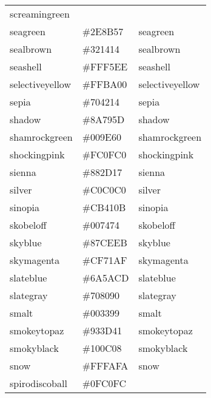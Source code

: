 \documentclass[
]{article}
\begin{document}
\begin{longtable}[]{@{}lll@{}}
\textcolor[rgb]{0.46,1.0,0.44}{screamingreen         }\tabularnewline
seagreen & \colorbox[rgb]{0.18,0.55,0.34}{\#2E8B57} &
\textcolor[rgb]{0.18,0.55,0.34}{seagreen              }\tabularnewline
sealbrown & \colorbox[rgb]{0.2,0.08,0.08}{\#321414} &
\textcolor[rgb]{0.2,0.08,0.08}{sealbrown             }\tabularnewline
seashell & \colorbox[rgb]{1.0,0.96,0.93}{\#FFF5EE} &
\textcolor[rgb]{1.0,0.96,0.93}{seashell              }\tabularnewline
selectiveyellow & \colorbox[rgb]{1.0,0.73,0.0}{\#FFBA00} &
\textcolor[rgb]{1.0,0.73,0.0}{selectiveyellow       }\tabularnewline
sepia & \colorbox[rgb]{0.44,0.26,0.08}{\#704214} &
\textcolor[rgb]{0.44,0.26,0.08}{sepia                 }\tabularnewline
shadow & \colorbox[rgb]{0.54,0.47,0.36}{\#8A795D} &
\textcolor[rgb]{0.54,0.47,0.36}{shadow                }\tabularnewline
shamrockgreen & \colorbox[rgb]{0.0,0.62,0.38}{\#009E60} &
\textcolor[rgb]{0.0,0.62,0.38}{shamrockgreen         }\tabularnewline
shockingpink & \colorbox[rgb]{0.99,0.06,0.75}{\#FC0FC0} &
\textcolor[rgb]{0.99,0.06,0.75}{shockingpink          }\tabularnewline
sienna & \colorbox[rgb]{0.53,0.18,0.09}{\#882D17} &
\textcolor[rgb]{0.53,0.18,0.09}{sienna                }\tabularnewline
silver & \colorbox[rgb]{0.75,0.75,0.75}{\#C0C0C0} &
\textcolor[rgb]{0.75,0.75,0.75}{silver                }\tabularnewline
sinopia & \colorbox[rgb]{0.8,0.25,0.04}{\#CB410B} &
\textcolor[rgb]{0.8,0.25,0.04}{sinopia               }\tabularnewline
skobeloff & \colorbox[rgb]{0.0,0.48,0.45}{\#007474} &
\textcolor[rgb]{0.0,0.48,0.45}{skobeloff             }\tabularnewline
skyblue & \colorbox[rgb]{0.53,0.81,0.98}{\#87CEEB} &
\textcolor[rgb]{0.53,0.81,0.92}{skyblue               }\tabularnewline
skymagenta & \colorbox[rgb]{0.81,0.44,0.69}{\#CF71AF} &
\textcolor[rgb]{0.81,0.44,0.69}{skymagenta            }\tabularnewline
slateblue & \colorbox[rgb]{0.42,0.35,0.8}{\#6A5ACD} &
\textcolor[rgb]{0.42,0.35,0.8}{slateblue             }\tabularnewline
slategray & \colorbox[rgb]{0.44,0.5,0.56}{\#708090} &
\textcolor[rgb]{0.44,0.5,0.56}{slategray             }\tabularnewline
smalt & \colorbox[rgb]{0.0,0.2,0.6}{\#003399} &
\textcolor[rgb]{0.0,0.2,0.6}{smalt                 }\tabularnewline
smokeytopaz & \colorbox[rgb]{0.58,0.25,0.03}{\#933D41} &
\textcolor[rgb]{0.58,0.25,0.03}{smokeytopaz           }\tabularnewline
smokyblack & \colorbox[rgb]{0.06,0.05,0.03}{\#100C08} &
\textcolor[rgb]{0.06,0.05,0.03}{smokyblack            }\tabularnewline
snow & \colorbox[rgb]{1.0,0.98,0.98}{\#FFFAFA} &
\textcolor[rgb]{1.0,0.98,0.98}{snow                  }\tabularnewline
spirodiscoball & \colorbox[rgb]{0.06,0.75,0.99}{\#0FC0FC} &

\end{longtable}
\end{document}
